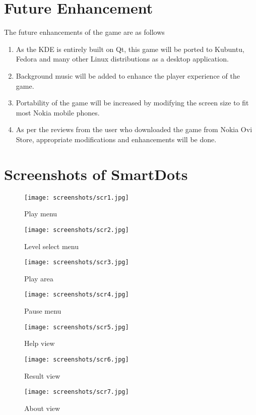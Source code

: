 \documentclass[a4paper,12pt]{article}
\begin{document}
\section{Future Enhancement}
\hspace{18pt}The future enhancements of the game are as follows
\begin{enumerate}
 \item As the KDE is entirely built on Qt, this game will be ported to Kubuntu, Fedora and many other Linux distributions as a desktop application.
 \item Background music will be added to enhance the player experience of the game.
 \item Portability of the game will be increased by modifying the screen size to fit most Nokia mobile phones.
 \item As per the reviews from the user who downloaded the game from Nokia Ovi Store, appropriate modifications and enhancements will be done. 
\end{enumerate}

\newpage
\section{Screenshots of SmartDots}

\begin{figure}[htp]
\centering
\texttt{[image: screenshots/scr1.jpg]}
\caption{Play menu}
\end{figure}

\begin{figure}[htp]
\centering
\texttt{[image: screenshots/scr2.jpg]}
\caption{Level select menu}
\end{figure}

\begin{figure}[htp]
\centering
\texttt{[image: screenshots/scr3.jpg]}
\caption{Play area}
\end{figure}

\begin{figure}[htp]
\centering
\texttt{[image: screenshots/scr4.jpg]}
\caption{Pause menu}
\end{figure}

\begin{figure}[htp]
\centering
\texttt{[image: screenshots/scr5.jpg]}
\caption{Help view}
\end{figure}

\begin{figure}[htp]
\centering
\texttt{[image: screenshots/scr6.jpg]}
\caption{Result view}
\end{figure}

\begin{figure}[htp]
\centering
\texttt{[image: screenshots/scr7.jpg]}
\caption{About view}
\end{figure}

\newpage                                                                                	
  
\end{document}

